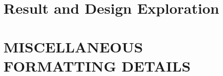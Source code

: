 \documentclass[]{spie}  %
\begin{document}
\section{Result and Design Exploration}
\label{sec:result}


\appendix    %

\section{MISCELLANEOUS FORMATTING DETAILS}
\label{sec:misc}


\acknowledgments %
\label{sec:acknowledgments}


\end{document}
